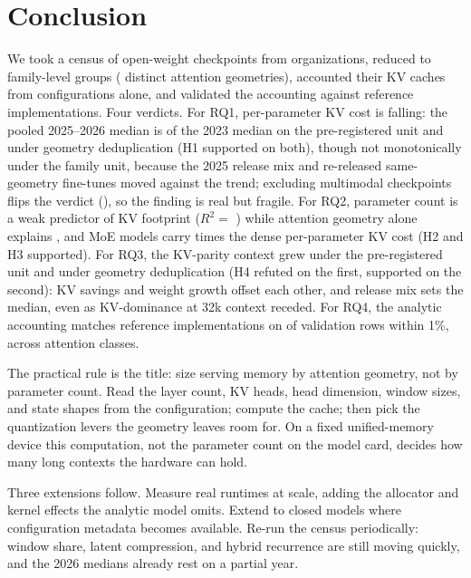 \section{Conclusion}\label{sec:conclusion}

We took a census of \kvcCensusRows{} open-weight checkpoints from
\kvcOrgCount{} organizations, reduced to \kvcDedupRows{} family-level groups
(\kvcGeoRows{} distinct attention geometries), accounted their KV caches from
configurations alone, and validated the accounting against reference
implementations. Four verdicts.
For RQ1, per-parameter KV cost is falling: the pooled 2025--2026 median is
\kvcHOneRatio{} of the 2023 median on the pre-registered unit and
\kvcHOneRatioGeo{} under geometry deduplication (H1 supported on both), though
not monotonically under the family unit, because the 2025 release mix and
re-released same-geometry fine-tunes moved against the trend; excluding
multimodal checkpoints flips the verdict (\kvcHOneRatioNoMM), so the finding is
real but fragile.
For RQ2, parameter count is a weak predictor of KV footprint ($R^2=$
\kvcParRsq) while attention geometry alone explains \kvcGeomRsq, and MoE models
carry \kvcHThreeRatio{} times the dense per-parameter KV cost (H2 and H3
supported).
For RQ3, the KV-parity context grew \kvcHFourRatio{} under the pre-registered unit
and \kvcHFourRatioGeo{} under geometry deduplication (H4 refuted on the first,
supported on the second): KV savings and weight growth offset each other, and
release mix sets the median, even as KV-dominance at 32k context receded.
For RQ4, the analytic accounting matches reference implementations on
\kvcValWithin{} of \kvcValRows{} validation rows within 1\%, across
\kvcValClasses{} attention classes.

The practical rule is the title: size serving memory by attention geometry, not
by parameter count. Read the layer count, KV heads, head dimension, window
sizes, and state shapes from the configuration; compute the cache; then pick the
quantization levers the geometry leaves room for. On a fixed unified-memory
device this computation, not the parameter count on the model card, decides how
many long contexts the hardware can hold.

Three extensions follow. Measure real runtimes at scale, adding the allocator
and kernel effects the analytic model omits. Extend to closed models where
configuration metadata becomes available. Re-run the census periodically:
window share, latent compression, and hybrid recurrence are still moving
quickly, and the 2026 medians already rest on a partial year.
